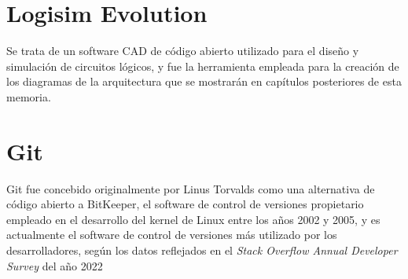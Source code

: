 \vspace{-0.4cm}

\section{Logisim Evolution}

Se trata de un software CAD de código abierto utilizado para el diseño y simulación de circuitos lógicos, y fue la herramienta empleada para la creación de los diagramas de la arquitectura que se mostrarán en capítulos posteriores de esta memoria.

\section{Git}

Git fue concebido originalmente por Linus Torvalds como una alternativa de código abierto a BitKeeper, el software de control de versiones propietario empleado en el desarrollo del kernel de Linux entre los años 2002 y 2005\cite{githistory}, y es actualmente el software de control de versiones más utilizado por los desarrolladores, según los datos reflejados en el \textit{Stack Overflow Annual Developer Survey} del año 2022\cite{stackoverflow}